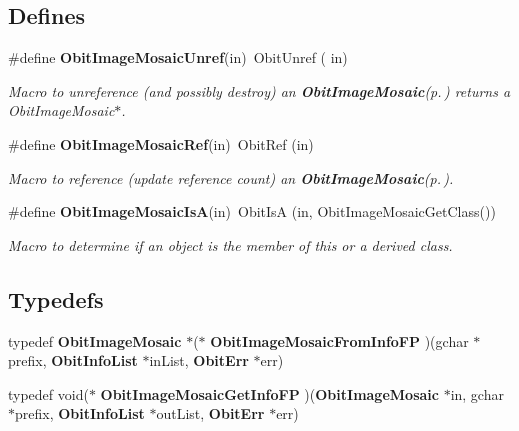 \subsection*{Defines}
\begin{CompactItemize}
\item 
\#define {\bf Obit\-Image\-Mosaic\-Unref}(in)\ Obit\-Unref ( in)
\begin{CompactList}\small\item\em Macro to unreference (and possibly destroy) an {\bf Obit\-Image\-Mosaic}{\rm (p.\,\pageref{structObitImageMosaic})} returns a Obit\-Image\-Mosaic$\ast$. \item\end{CompactList}\item 
\#define {\bf Obit\-Image\-Mosaic\-Ref}(in)\ Obit\-Ref (in)
\begin{CompactList}\small\item\em Macro to reference (update reference count) an {\bf Obit\-Image\-Mosaic}{\rm (p.\,\pageref{structObitImageMosaic})}. \item\end{CompactList}\item 
\#define {\bf Obit\-Image\-Mosaic\-Is\-A}(in)\ Obit\-Is\-A (in, Obit\-Image\-Mosaic\-Get\-Class())
\begin{CompactList}\small\item\em Macro to determine if an object is the member of this or a derived class. \item\end{CompactList}\end{CompactItemize}
\subsection*{Typedefs}
\begin{CompactItemize}
\item 
typedef {\bf Obit\-Image\-Mosaic} $\ast$($\ast$ {\bf Obit\-Image\-Mosaic\-From\-Info\-FP} )(gchar $\ast$prefix, {\bf Obit\-Info\-List} $\ast$in\-List, {\bf Obit\-Err} $\ast$err)
\item 
typedef void($\ast$ {\bf Obit\-Image\-Mosaic\-Get\-Info\-FP} )({\bf Obit\-Image\-Mosaic} $\ast$in, gchar $\ast$prefix, {\bf Obit\-Info\-List} $\ast$out\-List, {\bf Obit\-Err} $\ast$err)
\end{CompactItemize}
